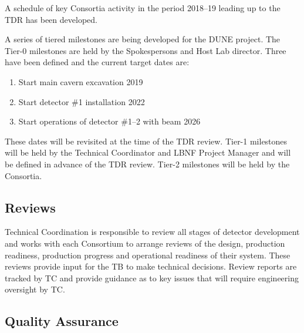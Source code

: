 A schedule of key Consortia activity in the period 2018--19 leading up
to the TDR has been developed.

A series of tiered milestones are being developed for the DUNE
project. The Tier-0 milestones are held by the Spokespersons and Host
Lab director. Three have been defined and the current target dates
are:
\begin{enumerate}
\item Start main cavern excavation \hspace{2.1in} 2019
\item Start detector \#1 installation \hspace{2.1in} 2022
\item Start operations of detector \#1--2 with beam \hspace{1in} 2026
\end{enumerate}
These dates will be revisited at the time of the TDR review.  Tier-1
milestones will be held by the Technical Coordinator and LBNF Project
Manager and will be defined in advance of the TDR review. Tier-2
milestones will be held by the Consortia.

\subsection{Reviews}
\label{sec:fdsp-coord-reviews}

Technical Coordination is responsible to review all stages of detector
development and works with each Consortium to arrange reviews of the
design, production readiness, production progress and operational
readiness of their system.  These reviews provide input for the TB to
make technical decisions.  Review reports are tracked by TC and
provide guidance as to key issues that will require engineering
oversight by TC.

\subsection{Quality Assurance}
\label{sec:fdsp-coord-qa}


